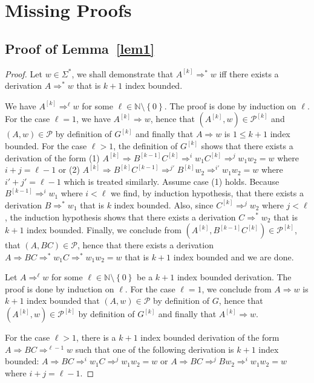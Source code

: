 \documentclass{fsttcs}
\def\set#1{{\left\{ #1 \right\}}}
\def\nats{{\mathbb{N}}}
\def\prod{\mathcal{P}}
\begin{document}
\pagebreak
\section{Missing Proofs}

\subsection{Proof of Lemma~\ref{lem1}}
\begin{proof}
	Let \(w\in\Sigma^*\), we shall demonstrate that
	\(A^{[k]}\Rightarrow^* w\) if{}f there exists a derivation \(A\Rightarrow^* w\)
	that is \(k+1\) index bounded.
	
We have \(A^{[k]}\Rightarrow^{\ell} w\) for some
\(\ell\in\nats\setminus\set{0}\). The proof is done by induction on \(\ell\).
For the case \(\ell=1\), we have \(A^{[k]}\Rightarrow w\), hence that \(
(A^{[k]},w)\in\prod^{[k]} \) and \( (A,w)\in\prod\) by definition of
\(G^{[k]}\) and finally that \(A\Rightarrow w\) is \(1\leq k+1\) index bounded.
For the case \(\ell>1\), the definition of \(G^{[k]}\) shows that there exists
a derivation of the form (1) \(A^{[k]}\Rightarrow B^{[k-1]} C^{[k]}
\Rightarrow^i w_1 C^{[k]} \Rightarrow^j w_1w_2=w \) where \(i+j=\ell-1\) or (2)
\(A^{[k]}\Rightarrow B^{[k]} C^{[k-1]} \Rightarrow^{j'} B^{[k]} w_2 \Rightarrow^{i'} w_1w_2=w \)
where \(i'+j'=\ell-1\) which is treated similarly.  
Assume case (1) holds. Because \(B^{[k-1]}\Rightarrow^i w_1\) where \(i<\ell\)
we find, by induction hypothesis, that there exists a derivation \(B\Rightarrow^*
w_1\) that is \(k\) index bounded. Also, since \(C^{[k]}\Rightarrow^j w_2\) where \(j<\ell\), 
the induction hypothesis shows that there exists a derivation \(C\Rightarrow^*
w_2\) that is \(k+1\) index bounded.  Finally,
we conclude from  \((A^{[k]},B^{[k-1]} C^{[k]})\in\prod^{[k]}\), that \((A,BC)\in\prod\), hence
that there exists a derivation \(A\Rightarrow BC\Rightarrow^* w_1
C\Rightarrow^* w_1 w_2 =w\) that is \(k+1\) index bounded and we are done.

Let \(A\Rightarrow^{\ell} w\) for some
\(\ell\in\nats\setminus\set{0}\) be a \(k+1\) index bounded derivation. 
The proof is done by induction on \(\ell\).
For the case \(\ell=1\), we conclude from \(A\Rightarrow w\) is \(k+1\) index bounded that
\((A,w)\in\prod\) by definition of \(G\), hence that \(
(A^{[k]},w)\in\prod^{[k]} \) by definition of \(G^{[k]}\) and finally that
\(A^{[k]}\Rightarrow w\).

For the case \(\ell>1\), there is a \(k+1\) index bounded derivation of the
form \(A\Rightarrow BC\Rightarrow^{\ell-1} w\) such that one of the following
derivation is \(k+1\) index bounded: \(A\Rightarrow BC\Rightarrow^i w_1
C\Rightarrow^j w_1 w_2=w\) or \(A\Rightarrow BC\Rightarrow^j B w_2\Rightarrow^i
w_1 w_2=w\) where \(i+j=\ell-1\).


\end{proof}
\end{document}
